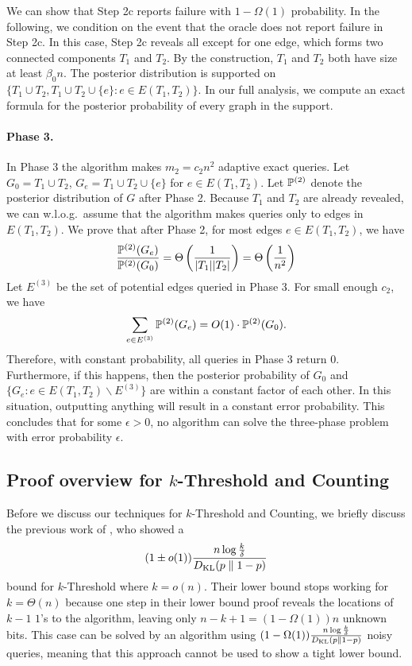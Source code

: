 We can show that Step 2c reports failure with $1-\Omega(1)$ probability.
In the following, we condition on the event that the oracle does not report failure in Step 2c.
In this case, Step 2c reveals all except for one edge, which forms two connected components $T_1$ and $T_2$.
By the construction, $T_1$ and $T_2$ both have size at least $\beta_0 n$.
The posterior distribution is supported on $\{T_1\cup T_2, T_1\cup T_2\cup \{e\}: e\in E(T_1,T_2)\}$.
In our full analysis, we compute an exact formula for the posterior probability of every graph in the support.

\paragraph{Phase 3.}
In Phase 3 the algorithm makes $m_2=c_2 n^2$ adaptive exact queries.
Let $G_0 = T_1\cup T_2$, $G_e = T_1\cup T_2 \cup \{e\}$ for $e\in E(T_1,T_2)$.
Let $\mathbb{P}^{(2)}$ denote the posterior distribution of $G$ after Phase 2.
Because $T_1$ and $T_2$ are already revealed, we can w.l.o.g.~assume that the algorithm makes queries only to edges in $E(T_1,T_2)$.
We prove that after Phase 2, for most edges $e\in E(T_1,T_2)$, we have
\begin{align*}
  \frac{\mathbb{P}^{(2)}(G_e)}{\mathbb{P}^{(2)}(G_0)} = \Theta\left(\frac 1{|T_1||T_2|}\right) = \Theta\left(\frac 1{n^2}\right)
\end{align*}
Let $E^{(3)}$ be the set of potential edges queried in Phase 3.
For small enough  $c_2$, we have
\begin{align*}
  \sum_{e\in E^{(3)}} \mathbb{P}^{(2)}(G_e) = O(1) \cdot \mathbb{P}^{(2)}(G_0).
\end{align*}
Therefore, with constant probability, all queries in Phase 3 return $0$.
Furthermore, if this happens, then the posterior probability of $G_0$ and $\{G_e: e\in E(T_1,T_2)\backslash E^{(3)}\}$ are within a constant factor of each other.
In this situation, outputting anything will result in a constant error probability.
This concludes that for some $\epsilon>0$, no algorithm can solve the three-phase problem with error probability $\epsilon$.

\subsection{Proof overview for \texorpdfstring{$k$}{k}-Threshold and Counting} \label{sec:threshold:overview}

Before we discuss our techniques for $k$-Threshold and Counting, we briefly discuss the previous work of \cite{wang2024noisy}, who showed a
\[
(1 \pm o(1)) \frac{n \log \frac{k}{\delta}}{D_{\operatorname{\mathrm{KL}}}(p \parallel 1-p)}
\]
bound for $k$-Threshold where $k = o(n)$. Their lower bound stops working for $k = \Theta(n)$ because one step in their lower bound proof reveals the locations of $k-1$ $1$'s to the algorithm, leaving only $n-k+1=(1-\Omega(1))n$ unknown bits. This case can be solved by an algorithm using $(1-\Omega(1))\frac{n \log \frac{k}{\delta}}{D_{\operatorname{\mathrm{KL}}}(p \parallel 1-p)}$ noisy queries, meaning that this approach cannot be used to show a tight lower bound.

